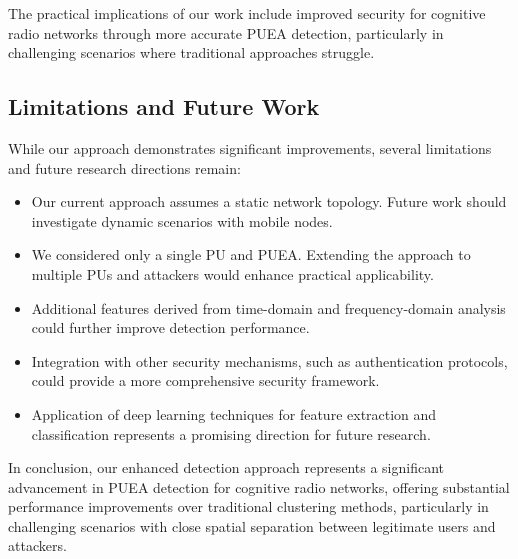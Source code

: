 \documentclass[conference]{IEEEtran}
\begin{document}
The practical implications of our work include improved security for cognitive radio networks through more accurate PUEA detection, particularly in challenging scenarios where traditional approaches struggle.

\subsection{Limitations and Future Work}

While our approach demonstrates significant improvements, several limitations and future research directions remain:

\begin{itemize}
    \item Our current approach assumes a static network topology. Future work should investigate dynamic scenarios with mobile nodes.
    \item We considered only a single PU and PUEA. Extending the approach to multiple PUs and attackers would enhance practical applicability.
    \item Additional features derived from time-domain and frequency-domain analysis could further improve detection performance.
    \item Integration with other security mechanisms, such as authentication protocols, could provide a more comprehensive security framework.
    \item Application of deep learning techniques for feature extraction and classification represents a promising direction for future research.
\end{itemize}

In conclusion, our enhanced detection approach represents a significant advancement in PUEA detection for cognitive radio networks, offering substantial performance improvements over traditional clustering methods, particularly in challenging scenarios with close spatial separation between legitimate users and attackers.
\end{document}

